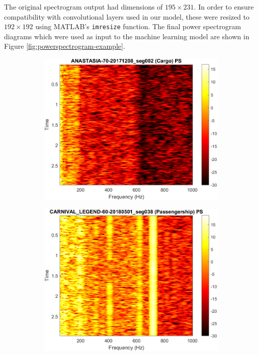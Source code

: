 The original spectrogram output had dimensions of $195 \times 231$. In order to ensure compatibility with convolutional layers used in our model, these were resized to $192 \times 192$ using MATLAB's \texttt{imresize} function. The final power spectrogram diagrams which were used as input to the machine learning model are shown in Figure \ref{fig:powerspectrogram-example}.

\begin{figure}[p]
    \centering
    \begin{subfigure}{0.49\textwidth}
        \centering
        \includegraphics[width=\linewidth]{img/ch3/power_spectrogram/Cargo.png} 
    \end{subfigure}
    \hfill
    \begin{subfigure}{0.49\textwidth}
        \centering
        \includegraphics[width=\linewidth]{img/ch3/power_spectrogram/Passengership.png} 
    \end{subfigure}


\end{figure}
